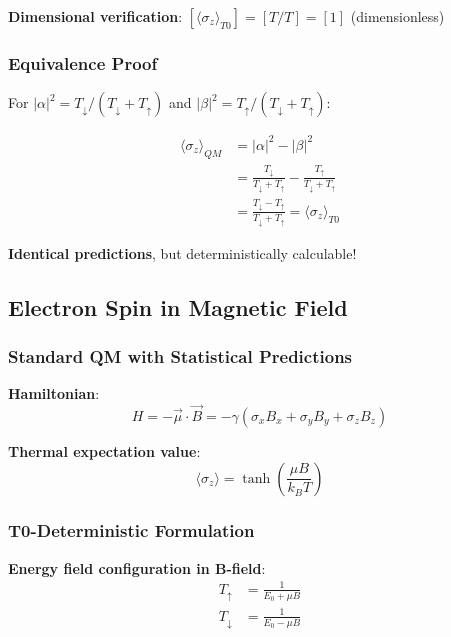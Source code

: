 \documentclass[12pt,a4paper]{article}
\begin{document}
	\textbf{Dimensional verification}: $[\langle \sigma_z \rangle_{T0}] = [T/T] = [1]$ (dimensionless) \checkmark
	
	\subsubsection{Equivalence Proof}
	
	For $|\alpha|^2 = T_{\downarrow}/(T_{\downarrow} + T_{\uparrow})$ and $|\beta|^2 = T_{\uparrow}/(T_{\downarrow} + T_{\uparrow})$:
	
	\begin{align}
		\langle \sigma_z \rangle_{QM} &= |\alpha|^2 - |\beta|^2 \\
		&= \frac{T_{\downarrow}}{T_{\downarrow} + T_{\uparrow}} - \frac{T_{\uparrow}}{T_{\downarrow} + T_{\uparrow}} \\
		&= \frac{T_{\downarrow} - T_{\uparrow}}{T_{\downarrow} + T_{\uparrow}} = \langle \sigma_z \rangle_{T0}
	\end{align}
	
	\textbf{Identical predictions}, but deterministically calculable!
	
	\subsection{Electron Spin in Magnetic Field}
	
	\subsubsection{Standard QM with Statistical Predictions}
	
	\textbf{Hamiltonian}:
	\begin{equation}
		H = -\vec{\mu} \cdot \vec{B} = -\gamma(\sigma_x B_x + \sigma_y B_y + \sigma_z B_z)
	\end{equation}
	
	\textbf{Thermal expectation value}:
	\begin{equation}
		\langle \sigma_z \rangle = \tanh\left(\frac{\mu B}{k_B T}\right)
	\end{equation}
	
	\subsubsection{T0-Deterministic Formulation}
	
	\textbf{Energy field configuration in B-field}:
	\begin{align}
		T_{\uparrow} &= \frac{1}{E_0 + \mu B} \\
		T_{\downarrow} &= \frac{1}{E_0 - \mu B}
	\end{align}
	
\end{document}
